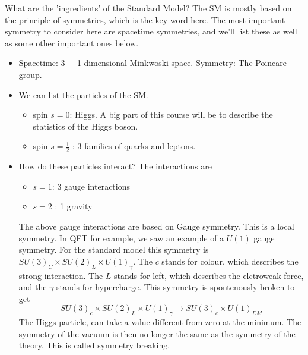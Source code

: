 \documentclass[11pt, oneside]{article}   	%
\theoremstyle{slanted}
\begin{document}
What are the 'ingredients' of the Standard Model? 
The SM is mostly based on the principle of symmetries, which is the key word here. 
The most important symmetry to consider here are spacetime symmetries, 
and we'll list these as well as some other important ones 
below. 
\begin{itemize}
	\item  Spacetime: 3 + 1 dimensional Minkwoski space. 
		Symmetry: The Poincare group.
	\item We can list the particles of the SM. 
		\begin{itemize}
			\item spin $ s  = 0 $: Higgs. A big part of this 
				course will be to describe the statistics of 
				the Higgs boson. 
			\item spin $ s = \frac{1}{2 } $ : 3 families of quarks and leptons. 
		\end{itemize}
	\item How do these particles interact? The interactions are
		\begin{itemize}
			\item $ s = 1 $: 3 gauge interactions
			\item $ s= 2 $  : 1 gravity 
		\end{itemize}
	The above gauge interactions are based on Gauge symmetry. 
	This is a local symmetry. In QFT for example, we 
	saw an example of a $ U ( 1 ) $ gauge symmetry. 
	For the standard model this symmetry is $ SU ( 3 )_ C \times 
	SU ( 2 ) _{ L } \times U ( 1 ) _{ \gamma }$. 
	The $ c $ stands for colour, which describes the 
	strong interaction. The $ L $ stands for left, which 
	describes the elctroweak force, and the $ \gamma $ stands 
	for hypercharge. This symmetry is 
	spontenously broken to get 
	\[
	 SU (  3 ) _  c \times SU ( 2 ) _ L \times U ( 1 ) _{ \gamma  } 
	 \to SU ( 3 ) _ c \times U ( 1 ) _{ EM } 
	\]  
	The Higgs particle, can take 
	a value different from zero at the minimum. 
	The symmetry of the vacuum is then no longer the 
	same as the symmetry of the theory. 
	This is called symmetry breaking. 


\end{itemize}
\end{document}
